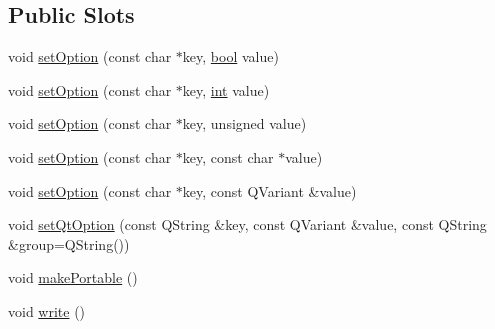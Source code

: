 \subsection*{Public Slots}
\begin{DoxyCompactItemize}
\item 
void \mbox{\hyperlink{class_q_g_b_a_1_1_config_controller_ace91684a6678e30d8366fd7262c176dd}{set\+Option}} (const char $\ast$key, \mbox{\hyperlink{libretro_8h_a4a26dcae73fb7e1528214a068aca317e}{bool}} value)
\item 
void \mbox{\hyperlink{class_q_g_b_a_1_1_config_controller_a63c940b97dda27d822b7255f88e0691c}{set\+Option}} (const char $\ast$key, \mbox{\hyperlink{ioapi_8h_a787fa3cf048117ba7123753c1e74fcd6}{int}} value)
\item 
void \mbox{\hyperlink{class_q_g_b_a_1_1_config_controller_aece01bed508411acb7fd4ce0012e7589}{set\+Option}} (const char $\ast$key, unsigned value)
\item 
void \mbox{\hyperlink{class_q_g_b_a_1_1_config_controller_abbb3d3f7816f281b88629a65dd9eb096}{set\+Option}} (const char $\ast$key, const char $\ast$value)
\item 
void \mbox{\hyperlink{class_q_g_b_a_1_1_config_controller_ad4512bbe0cc12a07bdd1bc1091767be9}{set\+Option}} (const char $\ast$key, const Q\+Variant \&value)
\item 
void \mbox{\hyperlink{class_q_g_b_a_1_1_config_controller_a26176eb3e6f0a90d93e8222338513657}{set\+Qt\+Option}} (const Q\+String \&key, const Q\+Variant \&value, const Q\+String \&group=Q\+String())
\item 
void \mbox{\hyperlink{class_q_g_b_a_1_1_config_controller_af7cecd2d1e8b2c9f631d3b2cc47aec5f}{make\+Portable}} ()
\item 
void \mbox{\hyperlink{class_q_g_b_a_1_1_config_controller_a7a2b85f2324ec8ef483e6c527bce2061}{write}} ()
\end{DoxyCompactItemize}
